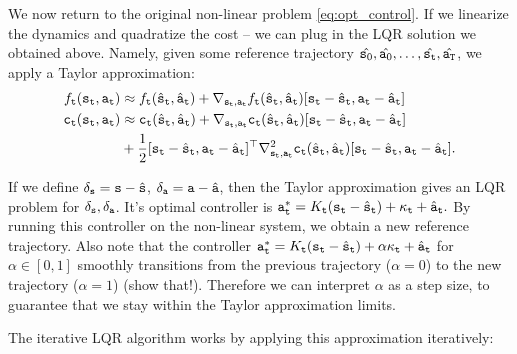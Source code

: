 We now return to the original non-linear problem \ref{eq:opt_control}. If we linearize the dynamics and quadratize the cost -- we can plug in the LQR solution we obtained above. Namely, given some reference trajectory $\hat{{\tt s}_0},\hat{{\tt a}_0},\dots,\hat{{\tt s}_{\tt t}}, \hat{{\tt a}_{\tt T}}$, we apply a Taylor approximation:
\begin{equation}\label{eq:Taylor_approx}
\begin{split}
    {f_{\tt t}}({{\tt s}_{\tt t}},{{\tt a}_{\tt t}}) &\approx {f_{\tt t}}({\hat{{\tt s}}_{\tt t}},{\hat{{\tt a}}_{\tt t}}) + \nabla_{{\tt s}_{\tt t}, {\tt a}_{\tt t}}f_{\tt t}({\hat{{\tt s}}_{\tt t}},{\hat{{\tt a}}_{\tt t}}) [{\tt s}_{\tt t} - \hat{{\tt s}}_{\tt t}, {\tt a}_{\tt t} - \hat{{\tt a}}_{\tt t}] \\
    {{\tt c}_{\tt t}}({{\tt s}_{\tt t}},{{\tt a}_{\tt t}}) &\approx {{\tt c}_{\tt t}}({\hat{{\tt s}}_{\tt t}},{\hat{{\tt a}}_{\tt t}}) + \nabla_{{\tt s}_{\tt t}, {\tt a}_{\tt t}}{\tt c}_{\tt t}({\hat{{\tt s}}_{\tt t}},{\hat{{\tt a}}_{\tt t}}) [{\tt s}_{\tt t} - \hat{{\tt s}}_{\tt t}, {\tt a}_{\tt t} - \hat{{\tt a}}_{\tt t}] \\
    & + \frac{1}{2} [{\tt s}_{\tt t} - \hat{{\tt s}}_{\tt t}, {\tt a}_{\tt t} - \hat{{\tt a}}_{\tt t}]^\top \nabla^2_{{\tt s}_{\tt t}, {\tt a}_{\tt t}}{\tt c}_{\tt t}({\hat{{\tt s}}_{\tt t}},{\hat{{\tt a}}_{\tt t}}) [{\tt s}_{\tt t} - \hat{{\tt s}}_{\tt t}, {\tt a}_{\tt t} - \hat{{\tt a}}_{\tt t}].
\end{split}
\end{equation}

If we define $\delta_{\tt s} = {\tt s} - \hat{{\tt s}}$, $\delta_{\tt a} = {\tt a} - \hat{{\tt a}}$, then the Taylor approximation gives an LQR problem for $\delta_{\tt s}, \delta_{\tt a}$. It's optimal controller is ${\tt a}_{\tt t}^* = K_{\tt t} ({\tt s}_{\tt t} - \hat{{\tt s}}_{\tt t}) + \kappa_{\tt t} + \hat{{\tt a}}_{\tt t}.$ By running this controller on the non-linear system, we obtain a new reference trajectory. 
Also note that the controller ${\tt a}_{\tt t}^* = K_{\tt t} ({\tt s}_{\tt t} - \hat{{\tt s}}_{\tt t}) + \alpha \kappa_{\tt t} + \hat{{\tt a}}_{\tt t}$ for $\alpha \in [0,1]$ smoothly transitions from the previous trajectory ($\alpha=0$) to the new trajectory ($\alpha=1$) (show that!). Therefore we can interpret $\alpha$ as a step size, to guarantee that we stay within the Taylor approximation limits.

The iterative LQR algorithm works by applying this approximation iteratively:

